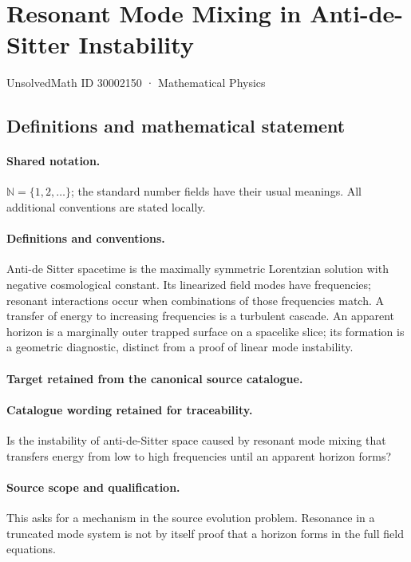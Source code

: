\documentclass[11pt]{article}
\begin{document}
\setcounter{section}{30002149}
\section{Resonant Mode Mixing in Anti-de-Sitter Instability}\label{30002150}
{\small UnsolvedMath ID 30002150 · Mathematical Physics}
\subsection{Definitions and mathematical statement}

\paragraph{Shared notation.}$\mathbb N=\{1,2,\ldots\}$; the standard number fields have their usual meanings. All additional conventions are stated locally.


\paragraph{Definitions and conventions.}
Anti-de Sitter spacetime is the maximally symmetric Lorentzian solution with negative cosmological constant. Its linearized field modes have frequencies; resonant interactions occur when combinations of those frequencies match. A transfer of energy to increasing frequencies is a turbulent cascade. An apparent horizon is a marginally outer trapped surface on a spacelike slice; its formation is a geometric diagnostic, distinct from a proof of linear mode instability.

\paragraph{Target retained from the canonical source catalogue.}
\paragraph{Catalogue wording retained for traceability.}
Is the instability of anti-de-Sitter space caused by resonant mode mixing that transfers energy from low to high frequencies until an apparent horizon forms?

\paragraph{Source scope and qualification.}
This asks for a mechanism in the source evolution problem. Resonance in a truncated mode system is not by itself proof that a horizon forms in the full field equations.
\end{document}
